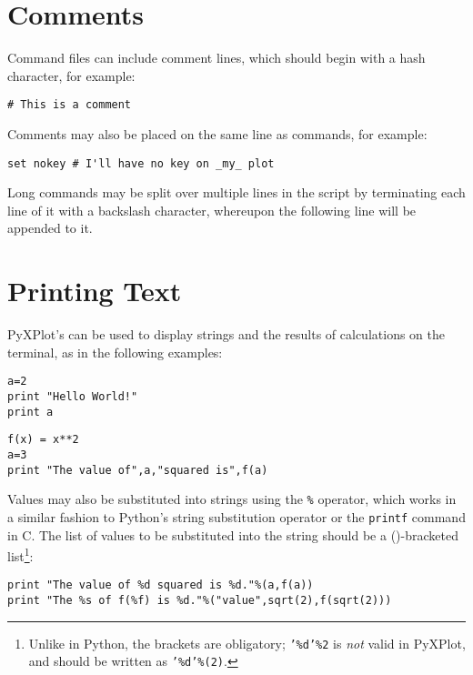 \section{Comments}

Command files can include comment lines, which should begin with a hash
character, for example:

\begin{verbatim}
# This is a comment
\end{verbatim}

\noindent Comments may also be placed on the same line as commands, for
example:

\begin{verbatim}
set nokey # I'll have no key on _my_ plot
\end{verbatim}

Long commands may be split over multiple lines in the script by terminating
each line of it with a backslash character, whereupon the following line will
be appended to it.

\section{Printing Text}
\label{sec:string_subs_op}

PyXPlot's  can be used to display strings and the results of
calculations on the terminal, as in the following examples:

\begin{verbatim}
a=2
print "Hello World!"
print a
\end{verbatim}

\begin{verbatim}
f(x) = x**2
a=3
print "The value of",a,"squared is",f(a)
\end{verbatim}

\noindent Values may also be substituted into strings using the {\tt \%}
operator, which works in a similar fashion
to Python's string substitution operator or
the {\tt printf} command in C.  The list of values to be substituted into the
string should be a ()-bracketed list\footnote{Unlike in Python, the brackets
are obligatory; {\tt '\%d'\%2} is {\it not} valid in PyXPlot, and should be
written as {\tt '\%d'\%(2)}.}:

\begin{verbatim}
print "The value of %d squared is %d."%(a,f(a))
print "The %s of f(%f) is %d."%("value",sqrt(2),f(sqrt(2)))
\end{verbatim}

